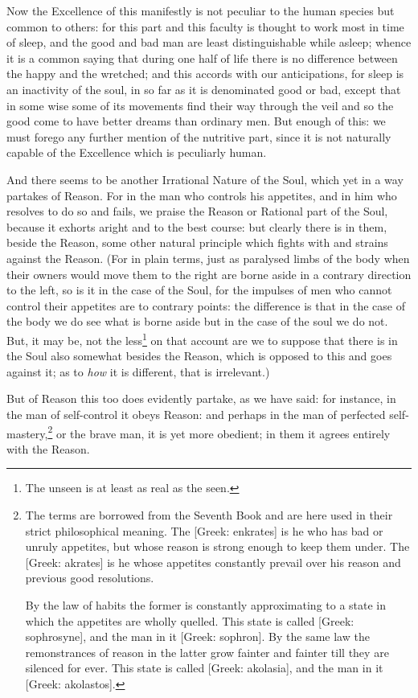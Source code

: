 Now the Excellence of this manifestly is not peculiar to the human species but
common to others: for this part and this faculty is thought to work most in
time of sleep, and the good and bad man are least distinguishable while asleep;
whence it is a common saying that during one half of life there is no
difference between the happy and the wretched; and this accords with our
anticipations, for sleep is an inactivity of the soul, in so far as it is
denominated good or bad, except that in some wise some of its movements find
their way through the veil and so the good come to have better dreams than
ordinary men. But enough of this: we must forego any further mention of the
nutritive part, since it is not naturally capable of the Excellence which is
peculiarly human.

And there seems to be another Irrational Nature of the Soul, which yet in a way
partakes of Reason. For in the man who controls his appetites, and in him who
resolves to do so and fails, we praise the Reason or Rational part of the Soul,
because it exhorts aright and to the best course: but clearly there is in them,
beside the Reason, some other natural principle which fights with and strains
against the Reason. (For in plain terms, just as paralysed limbs of the body
when their owners would move them to the right are borne aside in a contrary
direction to the left, so is it in the case of the Soul, for the impulses of
men who cannot control their appetites are to contrary points: the difference
is that in the case of the body we do see what is borne aside but in the case
of the soul we do not. But, it may be, not the less\footnote{The unseen is at least as real as the seen.}
on that account are we to suppose that there is in the Soul also somewhat
besides the Reason, which is opposed to this and goes against it; as to
\emph{how} it is different, that is irrelevant.)

But of Reason this too does evidently partake, as we have said: for instance,
in the man of self-control it obeys Reason: and perhaps in the man of perfected
self-mastery,\footnote{The terms are borrowed from the Seventh Book and are here used in their strict
philosophical meaning. The [Greek: enkrates] is he who has bad or unruly
appetites, but whose reason is strong enough to keep them under. The [Greek:
akrates] is he whose appetites constantly prevail over his reason and previous
good resolutions.

By the law of habits the former is constantly approximating to a state in
which the appetites are wholly quelled. This state is called [Greek:
sophrosyne], and the man in it [Greek: sophron]. By the same law the
remonstrances of reason in the latter grow fainter and fainter till they are
silenced for ever. This state is called [Greek: akolasia], and the man in it
[Greek: akolastos].}
or the brave man, it is yet more obedient; in them it agrees entirely
with the Reason.

